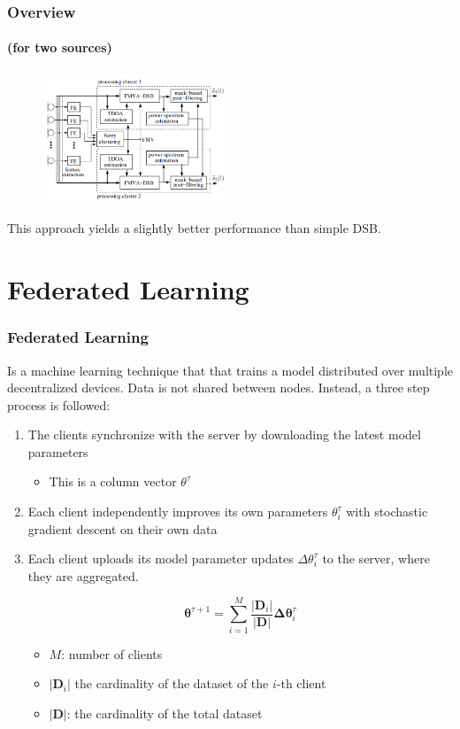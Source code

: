 \documentclass[aspectratio=169]{beamer}
\begin{document}
\begin{frame}
    \frametitle{Overview }
    \framesubtitle{(for two sources)}
   \begin{figure}
  
          \includegraphics[width=0.5\textwidth]{images/schematic.png}
        \end{figure}
   This approach yields a slightly better performance than simple DSB.
\end{frame}
\section{Federated Learning}

\begin{frame}
    \frametitle{Federated Learning}
    Is a machine learning technique that that trains a model distributed over multiple decentralized devices. Data is not shared between nodes. Instead, a three step process is followed:

    \begin{enumerate}
        \item The clients synchronize with the server by downloading the latest model parameters
        \begin{itemize}
            \item This is a column vector $\theta^\tau$
        \end{itemize}
        \item Each client independently improves its own parameters $\theta^\tau_i$ with stochastic gradient descent on their own data
        \item Each client uploads its model parameter updates $\Delta\theta^\tau_i$ to the server, where they are aggregated.
        
        \begin{equation}
               \pmb \theta^{\tau+1} = \sum_{i=1}^M \frac{\lvert \pmb D_i \rvert}{\lvert \pmb D \rvert} \pmb \Delta \pmb \theta^\tau_i
            \end{equation}
        \begin{itemize}
            \item  $M$: number of clients
            \item $\lvert \pmb D_i \rvert$ the cardinality of the dataset of the $i$-th client
            \item $\lvert \pmb D \rvert$: the cardinality of the total dataset
        \end{itemize}
  
    \end{enumerate}
  
\end{frame}
\end{document}
